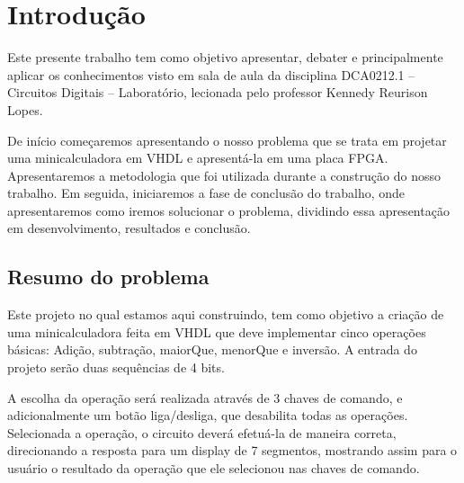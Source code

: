 \documentclass[
	12pt,				%
	openright,			%
	oneside,			%
	a4paper,			%
	brazil,				%
	]{abntex2}
\author{Discentes:\\\hspace{1cm}César Zaqueu Fernandes de Medeiros\\\hspace{1cm}Jhonat Heberson Avelino de Souza\\\hspace{1cm}Vinicius de Azevedo Menezes\\}
\date{08 de março de 2019}
\begin{document}
\frenchspacing 

\imprimircapa

\tableofcontents*
\cleardoublepage



\textual

\chapter{Introdução}

Este presente trabalho tem como objetivo apresentar, debater e principalmente aplicar os conhecimentos visto em sala de aula da disciplina DCA0212.1 – Circuitos Digitais – Laboratório, lecionada pelo professor Kennedy Reurison Lopes.
	
De início começaremos apresentando o nosso problema que se trata em projetar uma minicalculadora em VHDL e apresentá-la em uma placa FPGA. Apresentaremos a metodologia que foi utilizada durante a construção do nosso trabalho. Em seguida, iniciaremos a fase de conclusão do trabalho, onde apresentaremos como iremos solucionar o problema, dividindo essa apresentação em desenvolvimento, resultados e conclusão.

\section{Resumo do problema}

Este projeto no qual estamos aqui construindo, tem como objetivo a criação de uma minicalculadora feita em VHDL que deve implementar cinco operações básicas: Adição, subtração, maiorQue, menorQue e inversão. A entrada do projeto serão duas sequências de 4 bits.

A escolha da operação será realizada através de 3 chaves de comando, e adicionalmente um botão liga/desliga, que desabilita todas as operações. Selecionada a operação, o circuito deverá efetuá-la de maneira correta, direcionando a resposta para um display de 7 segmentos, mostrando assim para o usuário o resultado da operação que ele selecionou nas chaves de comando.      
\end{document}
